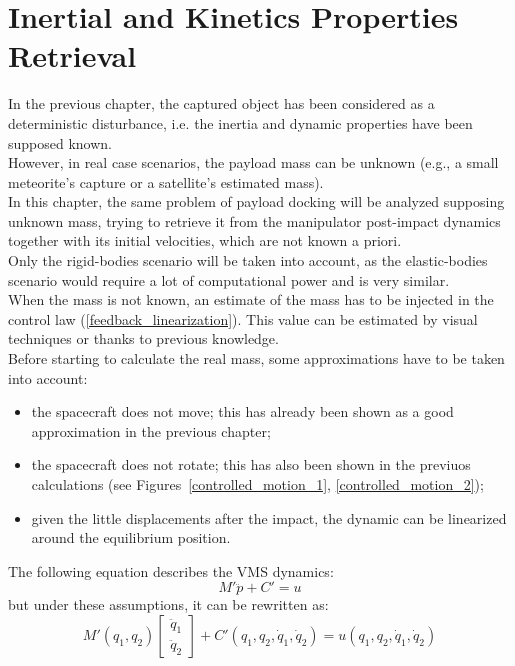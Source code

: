 \documentclass[a4paper,12pt,oneside]{report}
\begin{document}
\chapter{Inertial and Kinetics Properties Retrieval}
In the previous chapter, the captured object has been considered as a deterministic disturbance, i.e. the inertia and dynamic properties have been supposed known.\\
However, in real case scenarios, the payload mass can be unknown (e.g., a small meteorite's capture or a satellite's estimated mass).\\
In this chapter, the same problem of payload docking will be analyzed supposing unknown mass, trying to retrieve it from the manipulator post-impact dynamics together with its initial velocities, which are not known a priori.\\
Only the rigid-bodies scenario will be taken into account, as the elastic-bodies scenario would require a lot of computational power and is very similar.\\
When the mass is not known, an estimate of the mass has to be injected in the control law (\ref{feedback_linearization}). This value can be estimated by visual techniques or thanks to previous knowledge.\\
Before starting to calculate the real mass, some approximations have to be taken into account:
\begin{itemize}
  \item the spacecraft does not move; this has already been shown as a good approximation in the previous chapter;
  \item the spacecraft does not rotate; this has also been shown in the previuos calculations (see Figures~\ref{controlled_motion_1}, \ref{controlled_motion_2});
  \item given the little displacements after the impact, the dynamic can be linearized around the equilibrium position.
\end{itemize}
The following equation describes the VMS dynamics:
\begin{equation}
  M'\ddot{p}+C'=u
\end{equation}
but under these assumptions, it can be rewritten as:
\begin{equation}
  M'(q_1,q_2)\begin{bmatrix}
    \ddot{q}_1\\
    \ddot{q}_2
  \end{bmatrix}+C'(q_1,q_2,\dot{q}_1,\dot{q}_2)=u(q_1,q_2,\dot{q}_1,\dot{q}_2)
\end{equation}
\end{document}

